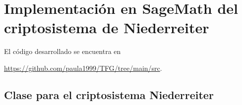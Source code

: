 \chapter[Implementación en SageMath del criptosistema de Niederreiter]{Implementación en SageMath del criptosistema de Niederreiter}
\label{annex:sage-Niederreiter}


El código desarrollado se encuentra en
\begin{center}
    \url{https://github.com/paula1999/TFG/tree/main/src}.
\end{center}


\section{Clase para el criptosistema Niederreiter}

